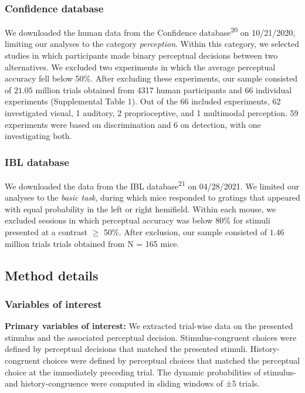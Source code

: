\documentclass[
]{article}
\begin{document}
\hypertarget{confidence-database}{%
\subsubsection{Confidence database}\label{confidence-database}}

We downloaded the human data from the Confidence
database\textsuperscript{20} on 10/21/2020, limiting our analyses to the
category \emph{perception}. Within this category, we selected studies in
which participants made binary perceptual decisions between two
alternatives. We excluded two experiments in which the average
perceptual accuracy fell below 50\%. After excluding these experiments,
our sample consisted of \(21.05\) million trials obtained from 4317
human participants and 66 individual experiments (Supplemental Table 1).
Out of the 66 included experiments, 62 investigated visual, 1 auditory,
2 proprioceptive, and 1 multimodal perception. 59 experiments were based
on discrimination and 6 on detection, with one investigating both.

\hypertarget{ibl-database}{%
\subsubsection{IBL database}\label{ibl-database}}

We downloaded the data from the IBL database\textsuperscript{21} on
04/28/2021. We limited our analyses to the \emph{basic task}, during
which mice responded to gratings that appeared with equal probability in
the left or right hemifield. Within each mouse, we excluded sessions in
which perceptual accuracy was below 80\% for stimuli presented at a
contrast \(\geq\) 50\%. After exclusion, our sample consisted of
\(1.46\) million trials trials obtained from N = 165 mice.

\hypertarget{method-details}{%
\subsection{Method details}\label{method-details}}

\hypertarget{variables-of-interest}{%
\subsubsection{Variables of interest}\label{variables-of-interest}}

\textbf{Primary variables of interest:} We extracted trial-wise data on
the presented stimulus and the associated perceptual decision.
Stimulus-congruent choices were defined by perceptual decisions that
matched the presented stimuli. History-congruent choices were defined by
perceptual choices that matched the perceptual choice at the immediately
preceding trial. The dynamic probabilities of stimulus- and
history-congruence were computed in sliding windows of ±5 trials.
\end{document}
